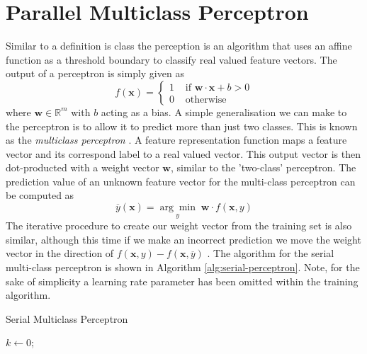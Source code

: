 \section{Parallel Multiclass Perceptron}

Similar to a definition is class the perception is an algorithm that uses an affine function as a threshold boundary to classify real valued feature vectors. The output of a perceptron is simply given as
\[
    f(\mathbf{x})=\left\{\begin{array}{ll}
    1 & \text { if } \mathbf{w} \cdot \mathbf{x}+b>0 \\
    0 & \text { otherwise }
    \end{array}\right.
\]
where $\bm{w} \in \mathbb{R}^{m}$ with $b$ acting as a bias. A simple generalisation we can make to the perceptron is to allow it to predict more than just two classes. This is known as the {\it multiclass perceptron} \cite{HastieTrevor2009EoSL}. A feature representation function maps a feature vector and its correspond label to a real valued vector. This output vector is then dot-producted with  a weight vector $\bm{w}$, similar to the 'two-class' perceptron. The prediction value of an unknown feature vector for the multi-class perceptron can be computed as
\[
    \overline{y} \left( \bm{x} \right) = \underset{y}{\arg \min } \; \bm{w} \cdot f(\bm{x}, y)
\]
The iterative procedure to create our weight vector from the training set is also similar, although this time if we make an incorrect prediction we move the weight vector in the direction of $f(\bm{x}, y) - f(\bm{x}, \overline{y})$ \cite{HastieTrevor2009EoSL}. The algorithm for the serial multi-class perceptron is shown in Algorithm \ref{alg:serial-perceptron}. Note, for the sake of simplicity a learning rate parameter has been omitted within the training algorithm.
\begin{algorithm}[ht!!!]
    \caption{Serial Multiclass Perceptron}
    \label{alg:serial-perceptron}
    \SetAlgoLined
    \BlankLine
    $k \gets 0$;
    
    \BlankLine
\end{algorithm}
